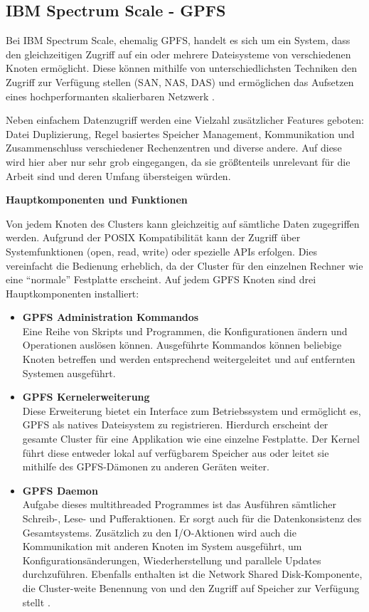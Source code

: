 \subsection{IBM Spectrum Scale - GPFS}

Bei IBM Spectrum Scale, ehemalig \ac{GPFS}, handelt es sich um ein System, dass den gleichzeitigen Zugriff auf ein oder mehrere Dateisysteme von verschiedenen Knoten ermöglicht. Diese können mithilfe von unterschiedlichsten Techniken den Zugriff zur Verfügung stellen (\ac{SAN}, \ac{NAS}, \ac{DAS}) und ermöglichen das Aufsetzen eines hochperformanten skalierbaren Netzwerk \parencite[S. 1]{ibm.2017}.

Neben einfachem Datenzugriff werden eine Vielzahl zusätzlicher Features geboten: Datei Duplizierung, Regel basiertes Speicher Management, Kommunikation und Zusammenschluss verschiedener Rechenzentren und diverse andere. Auf diese wird hier aber nur sehr grob eingegangen, da sie größtenteils unrelevant für die Arbeit sind und deren Umfang übersteigen würden.

\textbf{Hauptkomponenten und Funktionen}

Von jedem Knoten des Clusters kann gleichzeitig auf sämtliche Daten zugegriffen werden. Aufgrund der \gls{POSIX} Kompatibilität kann der Zugriff über Systemfunktionen (open, read, write) oder spezielle APIs erfolgen. Dies vereinfacht die Bedienung erheblich, da der Cluster für den einzelnen Rechner wie eine ``normale'' Festplatte erscheint. Auf jedem GPFS Knoten sind drei Hauptkomponenten installiert:

\begin{itemize}
	\item \textbf{GPFS Administration Kommandos} \\
	Eine Reihe von Skripts und Programmen, die Konfigurationen ändern und Operationen auslösen können. Ausgeführte Kommandos können beliebige Knoten betreffen und werden entsprechend weitergeleitet und auf entfernten Systemen ausgeführt.
	\item \textbf{GPFS Kernelerweiterung} \\
	Diese Erweiterung bietet ein Interface zum Betriebssystem und ermöglicht es, GPFS als natives Dateisystem zu registrieren. Hierdurch erscheint der gesamte Cluster für eine Applikation wie eine einzelne Festplatte. Der Kernel führt diese entweder lokal auf verfügbarem Speicher aus oder leitet sie mithilfe des GPFS-Dämonen zu anderen Geräten weiter.
	\item \textbf{GPFS Daemon} \\
	Aufgabe dieses multithreaded Programmes ist das Ausführen sämtlicher Schreib-, Lese- und Pufferaktionen. Er sorgt auch für die Datenkonsistenz des Gesamtsystems. Zusätzlich zu den I/O-Aktionen wird auch die Kommunikation mit anderen Knoten im System ausgeführt, um Konfigurationsänderungen, Wiederherstellung und parallele Updates durchzuführen.
	Ebenfalls enthalten ist die Network Shared Disk-Komponente, die Cluster-weite Benennung von und den Zugriff auf Speicher zur Verfügung stellt \parencite[S. 6]{ibm.2017}.  
\end{itemize} 

